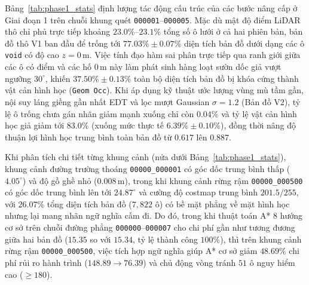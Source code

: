 \documentclass[a4paper,fleqn]{cas-sc}
\begin{document}
Bảng~\ref{tab:phase1_stats} định lượng tác động cấu trúc của các bước nâng cấp ở Giai đoạn 1 trên chuỗi khung quét \texttt{000001}--\texttt{000005}. Mặc dù mật độ điểm LiDAR thô chỉ phủ trực tiếp khoảng $23.0\%\text{--}23.1\%$ tổng số ô lưới ở cả hai phiên bản, bản đồ thô V1 ban đầu để trống tới $77.03\% \pm 0.07\%$ diện tích bản đồ dưới dạng các ô \texttt{void} có độ cao $z = 0\,\text{m}$. Việc tính đạo hàm sai phân trực tiếp qua ranh giới giữa các ô có điểm và các hố $0\,\text{m}$ này làm phát sinh hàng loạt sườn dốc giả vượt ngưỡng $30^\circ$, khiến $37.50\% \pm 0.13\%$ toàn bộ diện tích bản đồ bị khóa cứng thành vật cản hình học (\texttt{Geom Occ}). Khi áp dụng kỹ thuật ước lượng vùng mù tầm gần, nội suy láng giềng gần nhất EDT và lọc mượt Gaussian $\sigma=1.2$ (Bản đồ V2), tỷ lệ ô trống chưa gán nhãn giảm mạnh xuống chỉ còn $0.04\%$ và tỷ lệ vật cản hình học giả giảm tới \textbf{$83.0\%$} (xuống mức thực tế $6.39\% \pm 0.10\%$), đồng thời nâng độ thuận lợi hình học trung bình toàn bản đồ từ $0.617$ lên $0.887$.

Khi phân tích chi tiết từng khung cảnh (nửa dưới Bảng~\ref{tab:phase1_stats}), khung cảnh đường trường thoáng \texttt{00000\_000001} có góc dốc trung bình thấp ($4.05^\circ$) và độ gồ ghề nhỏ ($0.008\,\text{m}$), trong khi khung cảnh rừng rậm \texttt{00000\_000500} có góc dốc trung bình lên tới $24.87^\circ$ và cường độ costmap trung bình $201.5/255$, với $26.07\%$ tổng diện tích bản đồ ($7{,}822$ ô) có bề mặt phẳng về mặt hình học nhưng lại mang nhãn ngữ nghĩa cấm đi. Do đó, trong khi thuật toán A* 8 hướng cơ sở trên chuỗi đường phẳng \texttt{000000}--\texttt{000007} cho chi phí gần như tương đương giữa hai bản đồ ($15.35$ so với $15.34$, tỷ lệ thành công $100\%$), thì trên khung cảnh rừng rậm \texttt{00000\_000500}, việc tích hợp ngữ nghĩa giúp A* cơ sở giảm \textbf{$48.69\%$} chi phí rủi ro hành trình ($148.89 \to 76.39$) và chủ động vòng tránh $51$ ô nguy hiểm cao ($\ge 180$).
\end{document}
